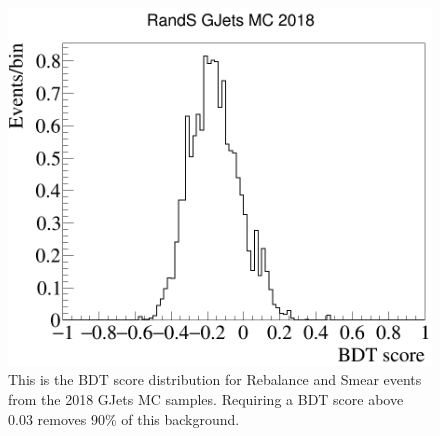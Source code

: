 \begin{figure}[h]
	\centering
	\includegraphics[width=0.7\linewidth]{Figures/GJets_BDT_2018}
	\caption[BDT response to Rebalance and Smear events in 2018 GJets MC]{This is the BDT score distribution for Rebalance and Smear events from the 2018 GJets MC samples. Requiring a BDT score above 0.03 removes 90\% of this background.}
	\label{fig:bdtgjets2018}
\end{figure}

